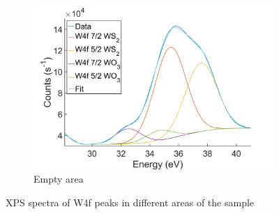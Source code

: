 \begin{figure}[!h]
\begin{center}
		\begin{subfigure}[b]{0.4\textwidth}
			\includegraphics[width=\textwidth]{WSe2/XPSW4fRef.png}
			\caption{Empty area}
			\label{fig:WSe2XPSRefW}
		\end{subfigure}
		\caption{XPS spectra of W4f peaks in different areas of the sample}
		\label{fig:WSe2XPSW}
	\end{center}
\end{figure}

